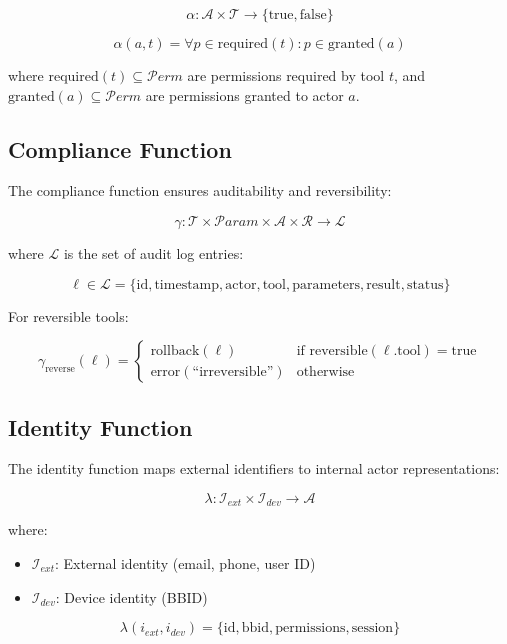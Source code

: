 \documentclass[11pt,a4paper]{article}
\begin{document}
\[
\alpha: \mathcal{A} \times \mathcal{T} \rightarrow \{\text{true}, \text{false}\}
\]

\[
\alpha(a, t) = \forall p \in \text{required}(t): p \in \text{granted}(a)
\]

where $\text{required}(t) \subseteq \mathcal{P}erm$ are permissions required by tool $t$, and $\text{granted}(a) \subseteq \mathcal{P}erm$ are permissions granted to actor $a$.

\subsection{Compliance Function}

The compliance function ensures auditability and reversibility:

\[
\gamma: \mathcal{T} \times \mathcal{P}aram \times \mathcal{A} \times \mathcal{R} \rightarrow \mathcal{L}
\]

where $\mathcal{L}$ is the set of audit log entries:

\[
\ell \in \mathcal{L} = \{\text{id}, \text{timestamp}, \text{actor}, \text{tool}, \text{parameters}, \text{result}, \text{status}\}
\]

For reversible tools:

\[
\gamma_{\text{reverse}}(\ell) = \begin{cases}
\text{rollback}(\ell) & \text{if } \text{reversible}(\ell.\text{tool}) = \text{true} \\
\text{error}(\text{``irreversible''}) & \text{otherwise}
\end{cases}
\]

\subsection{Identity Function}

The identity function maps external identifiers to internal actor representations:

\[
\lambda: \mathcal{I}_{ext} \times \mathcal{I}_{dev} \rightarrow \mathcal{A}
\]

where:
\begin{itemize}
    \item $\mathcal{I}_{ext}$: External identity (email, phone, user ID)
    \item $\mathcal{I}_{dev}$: Device identity (BBID)
\end{itemize}

\[
\lambda(i_{ext}, i_{dev}) = \{ \text{id}, \text{bbid}, \text{permissions}, \text{session} \}
\]
\end{document}
